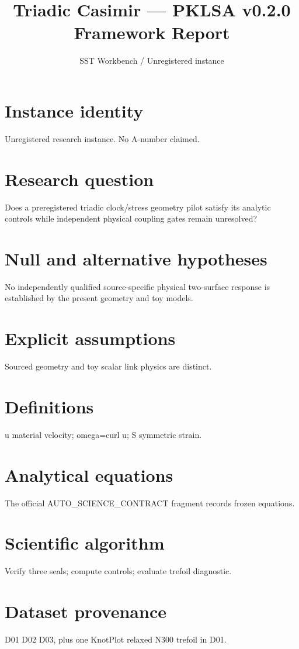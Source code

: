 \documentclass[10pt,a4paper]{article}
\title{Triadic Casimir --- PKLSA v0.2.0 Framework Report}
\author{SST Workbench / Unregistered instance}
\begin{document}
\maketitle
\section{Instance identity}
Unregistered research instance. No A-number claimed.
\section{Research question}
Does a preregistered triadic clock/stress geometry pilot satisfy its analytic controls while independent physical coupling gates remain unresolved?
\section{Null and alternative hypotheses}
No independently qualified source-specific physical two-surface response is established by the present geometry and toy models.
\section{Explicit assumptions}
Sourced geometry and toy scalar link physics are distinct.
\section{Definitions}
u material velocity; omega=curl u; S symmetric strain.
\section{Analytical equations}
The official AUTO\_SCIENCE\_CONTRACT fragment records frozen equations.

\section{Scientific algorithm}
Verify three seals; compute controls; evaluate trefoil diagnostic.
\section{Dataset provenance}
D01 D02 D03, plus one KnotPlot relaxed N300 trefoil in D01.
\end{document}
